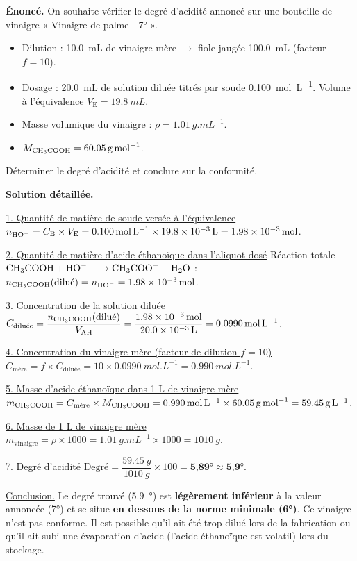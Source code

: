 \documentclass[11pt]{article}
\begin{document}
\begin{exoresolu}
\textbf{Énoncé.} On souhaite vérifier le degré d'acidité annoncé sur une bouteille de vinaigre « Vinaigre de palme - 7° ». 
\begin{itemize}
\item Dilution : \SI{10,0}{mL} de vinaigre mère $\rightarrow$ fiole jaugée \SI{100,0}{mL} (facteur $f=10$).
\item Dosage : \SI{20,0}{mL} de solution diluée titrés par soude \SI{0,100}{mol.L^{-1}}. Volume à l'équivalence $V_\text{E} = \SI{19,8}{mL}$.
\item Masse volumique du vinaigre : $\rho = \SI{1,01}{g.mL^{-1}}$.
\item $M_{\ce{CH3COOH}} = \SI{60,05}{g.mol^{-1}}$.
\end{itemize}
Déterminer le degré d'acidité et conclure sur la conformité.

\tcblower
\textbf{Solution détaillée.}

\underline{1. Quantité de matière de soude versée à l'équivalence}
$n_{\ce{HO-}} = C_\text{B} \times V_\text{E} = \SI{0,100}{mol.L^{-1}} \times \SI{19,8e-3}{L} = \SI{1,98e-3}{mol}$.

\underline{2. Quantité de matière d'acide éthanoïque dans l'aliquot dosé}
Réaction totale $\ce{CH3COOH + HO- -> CH3COO- + H2O}$ : $n_{\ce{CH3COOH}}(\text{dilué}) = n_{\ce{HO-}} = \SI{1,98e-3}{mol}$.

\underline{3. Concentration de la solution diluée}
$C_\text{diluée} = \dfrac{n_{\ce{CH3COOH}}(\text{dilué})}{V_\text{AH}} = \dfrac{\SI{1,98e-3}{mol}}{\SI{20,0e-3}{L}} = \SI{0,0990}{mol.L^{-1}}$.

\underline{4. Concentration du vinaigre mère (facteur de dilution $f=10$)}
$C_\text{mère} = f \times C_\text{diluée} = 10 \times \SI{0,0990}{mol.L^{-1}} = \SI{0,990}{mol.L^{-1}}$.

\underline{5. Masse d'acide éthanoïque dans 1 L de vinaigre mère}
$m_{\ce{CH3COOH}} = C_\text{mère} \times M_{\ce{CH3COOH}} = \SI{0,990}{mol.L^{-1}} \times \SI{60,05}{g.mol^{-1}} = \SI{59,45}{g.L^{-1}}$.

\underline{6. Masse de 1 L de vinaigre mère}
$m_{\text{vinaigre}} = \rho \times 1000 = \SI{1,01}{g.mL^{-1}} \times 1000 = \SI{1010}{g}$.

\underline{7. Degré d'acidité}
$\text{Degré} = \dfrac{\SI{59,45}{g}}{\SI{1010}{g}} \times 100 = \textbf{5,89°} \approx \textbf{5,9°}$.

\underline{Conclusion.} Le degré trouvé (\SI{5,9}{°}) est \textbf{légèrement inférieur} à la valeur annoncée (7°) et se situe \textbf{en dessous de la norme minimale (6°)}. Ce vinaigre n'est pas conforme. Il est possible qu'il ait été trop dilué lors de la fabrication ou qu'il ait subi une évaporation d'acide (l'acide éthanoïque est volatil) lors du stockage.
\end{exoresolu}
\end{document}

